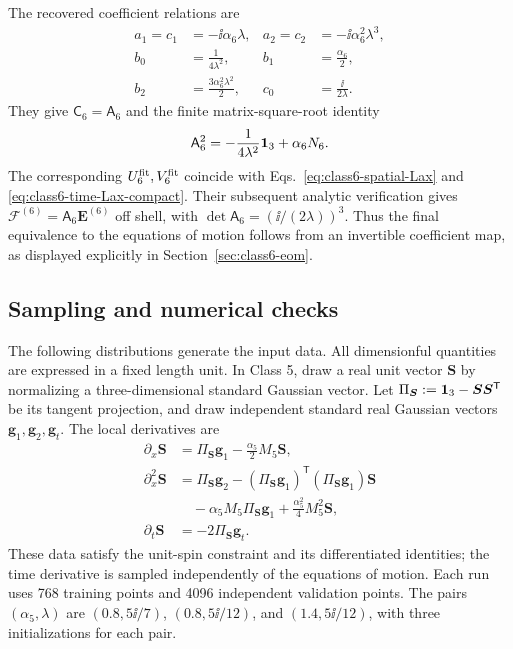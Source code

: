 The recovered coefficient relations are
\begin{align}
a_1=c_1&=-\ii\alpha_6\lambda,
&a_2=c_2&=-\ii\alpha_6^2\lambda^3,
\nonumber\\
b_0&=\frac{1}{4\lambda^2},
&b_1&=\frac{\alpha_6}{2},
\nonumber\\
b_2&=\frac{3\alpha_6^2\lambda^2}{2},
&c_0&=\frac{\ii}{2\lambda}.
\label{eq:ml-class6-coefficients}
\end{align}
They give $\mathsf C_6=\mathsf A_6$ and the finite matrix-square-root
identity
\begin{equation}
\mathsf A_6^2=-\frac{1}{4\lambda^2}\mathbf{1}_3+\alpha_6N_6.
\label{eq:ml-class6-square}
\end{equation}
The corresponding $U_6^{\rm fit},V_6^{\rm fit}$ coincide with
Eqs.~\eqref{eq:class6-spatial-Lax} and
\eqref{eq:class6-time-Lax-compact}.  Their subsequent analytic
verification gives
$\boldsymbol{\mathcal F}^{(6)}=\mathsf A_6\boldsymbol E^{(6)}$
off shell, with $\det\mathsf A_6=(\ii/(2\lambda))^3$.
Thus the final equivalence to the equations of motion follows from an
invertible coefficient map, as displayed explicitly in
Section~\ref{sec:class6-eom}.

\subsection{Sampling and numerical checks}
\label{sec:ml-numerics}

The following distributions generate the input data.  All dimensionful
quantities are expressed in a fixed length unit.
In Class 5, draw a real unit vector $\boldsymbol S$ by normalizing a
three-dimensional standard Gaussian vector.  Let
$\Pi_{\boldsymbol S}:=\mathbf{1}_3-\boldsymbol S\boldsymbol S^{\mathsf T}$
be its tangent projection, and draw independent standard real Gaussian
vectors $\boldsymbol g_1,\boldsymbol g_2,\boldsymbol g_t$.  The local
derivatives are
\begin{align}
\partial_x\boldsymbol S
&=\Pi_{\boldsymbol S}\boldsymbol g_1-\frac{\alpha_5}{2}M_5\boldsymbol S,
\nonumber\\
\partial_x^2\boldsymbol S
&=\Pi_{\boldsymbol S}\boldsymbol g_2
 -(\Pi_{\boldsymbol S}\boldsymbol g_1)^{\mathsf T}
   (\Pi_{\boldsymbol S}\boldsymbol g_1)\boldsymbol S
\nonumber\\
&\quad-\alpha_5M_5\Pi_{\boldsymbol S}\boldsymbol g_1
 +\frac{\alpha_5^2}{4}M_5^2\boldsymbol S,
\nonumber\\
\partial_t\boldsymbol S&=-2\Pi_{\boldsymbol S}\boldsymbol g_t.
\label{eq:ml-class5-sampling}
\end{align}
These data satisfy the unit-spin constraint and its differentiated
identities; the time derivative is sampled independently of the
equations of motion.  Each run uses 768 training points and 4096
independent validation points.  The pairs $(\alpha_5,\lambda)$ are
$(0.8,5\ii/7)$, $(0.8,5\ii/12)$, and $(1.4,5\ii/12)$, with three
initializations for each pair.


